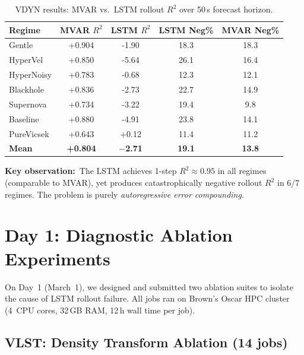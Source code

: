 \documentclass[11pt,letterpaper]{article}
\newcommand{\Rtwo}{R^2}
\newcommand{\regime}[1]{\textsf{#1}}
\begin{document}
\begin{table}[H]
\centering
\caption{VDYN results: MVAR vs.\ LSTM rollout $\Rtwo$ over 50\,s forecast horizon.}
\label{tab:vdyn}
\small
\begin{tabular}{@{}l S[table-format=+1.3] S[table-format=+1.3] S[table-format=2.1] S[table-format=2.1] @{}}
\toprule
Regime & {MVAR $\Rtwo$} & {LSTM $\Rtwo$} & {LSTM Neg\%} & {MVAR Neg\%} \\
\midrule
\regime{Gentle}     & +0.904 & -1.90 & 18.3 & 18.3 \\
\regime{HyperVel}   & +0.850 & -5.64 & 26.1 & 16.4 \\
\regime{HyperNoisy} & +0.783 & -0.68 & 12.3 & 12.1 \\
\regime{Blackhole}  & +0.836 & -2.73 & 22.7 & 14.9 \\
\regime{Supernova}  & +0.734 & -3.22 & 19.4 & 9.8  \\
\regime{Baseline}   & +0.880 & -4.91 & 23.8 & 14.1 \\
\regime{PureVicsek} & +0.643 & +0.12 & 11.4 & 11.2 \\
\midrule
\textbf{Mean}       & \textbf{+0.804} & \textbf{$-$2.71} & \textbf{19.1} & \textbf{13.8} \\
\bottomrule
\end{tabular}
\end{table}

\textbf{Key observation:}\ The LSTM achieves 1-step $\Rtwo\!\approx\!0.95$ in all
regimes (comparable to MVAR), yet produces catastrophically negative rollout $\Rtwo$
in 6/7 regimes.  The problem is purely \emph{autoregressive error compounding}.


\section{Day 1: Diagnostic Ablation Experiments}
\label{sec:day1}

On Day~1 (March~1), we designed and submitted two ablation suites to isolate the
cause of LSTM rollout failure.  All jobs ran on Brown's Oscar HPC cluster
(4~CPU cores, 32\,GB RAM, 12\,h wall time per job).

\subsection{VLST: Density Transform Ablation (14 jobs)}
\label{sec:vlst}
\end{document}
